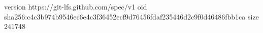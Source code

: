 version https://git-lfs.github.com/spec/v1
oid sha256:c4c3b974b9546ec6e4c3f36452ecf9d76456fdaf235446d2c9f0d46486fbb1ca
size 241748
